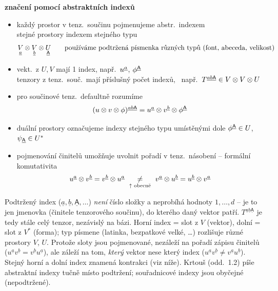 \textbf{značení pomocí abstraktních indexů}
\begin{itemize}[nosep]
  \item[] každý prostor v tenz.\ součinu pojmenujeme abstr.\ indexem \\
          stejné prostory indexem stejného typu
  \[
    \underset{\underline{a}}{V}\otimes\underset{\underline{b}}{V}\otimes\underset{\underline{\mathsf{A}}}{U}
    \qquad\text{používáme podtržená písmenka různých typů (font, abeceda, velikost)}
  \]
  \item[] vekt.\ z $U, V$ mají 1 index, např.\ $u^{\underline{a}}$, $\phi^{\underline{\mathsf{A}}}$ \\
          tenzory z tenz.\ souč.\ mají příslušný počet indexů, \ např.\ $T^{\underline{a}\underline{b}\underline{\mathsf{A}}}\in V\otimes V\otimes U$
  \item[] pro součinové tenz.\ defaultně rozumíme
          \[ (u\otimes v\otimes\phi)^{\underline{a}\underline{b}\underline{\mathsf{A}}} = u^{\underline{a}}\otimes v^{\underline{b}}\otimes\phi^{\underline{\mathsf{A}}} \]
  \item[] duální prostory označujeme indexy stejného typu umístěnými dole \quad
          $\phi^{\underline{\mathsf{A}}}\in U$, \ $\psi_{\underline{\mathsf{A}}}\in U^*$
  \item[] pojmenování činitelů umožňuje uvolnit pořadí v tenz.\ násobení -- formální komutativita
  \[
    u^{\underline{a}}\otimes v^{\underline{b}} = v^{\underline{b}}\otimes u^{\underline{a}}
    \ \underset{\text{\scriptsize$\uparrow$ obecně}}{\neq}\
    v^{\underline{a}}\otimes u^{\underline{b}} = u^{\underline{b}}\otimes v^{\underline{a}}
  \]
\end{itemize}

\begin{vysvetleni}
Podtržený index ($\underline a,\underline b,\underline{\mathsf A},\dots$) \emph{není} číslo složky a neprobíhá hodnoty $1,\dots,d$ -- je to jen jmenovka  (činitele tenzorového součinu), do kterého daný vektor patří. $T^{\underline a\underline b\underline{\mathsf A}}$ je tedy stále celý tenzor, nezávislý na bázi. Horní index = slot z $V$ (vektor), dolní = slot z $V^*$ (forma); typ písmene (latinka, bezpatkové velké, \dots) rozlišuje různé prostory $V$, $U$. Protože sloty jsou pojmenované, nezáleží na pořadí zápisu činitelů ($u^{\underline a}v^{\underline b}=v^{\underline b}u^{\underline a}$), ale záleží na tom, \emph{který} vektor nese který index ($u^{\underline a}v^{\underline b}\neq v^{\underline a}u^{\underline b}$). Stejný horní a dolní index znamená kontrakci (viz níže). Krtouš (odd.\ 1.2) píše abstraktní indexy tučně místo podtržení; souřadnicové indexy jsou obyčejné (nepodtržené).
\end{vysvetleni}

